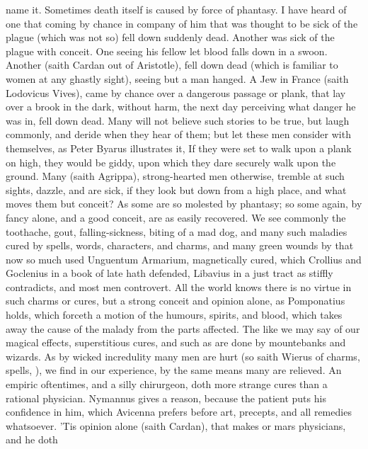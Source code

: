 {name it. Sometimes death itself is caused by force of phantasy. I have
heard of one that coming by chance in company of him that was thought
to be sick of the plague (which was not so) fell down suddenly dead.
Another was sick of the plague with conceit. One seeing his fellow let
blood falls down in a swoon. Another (saith Cardan out of
Aristotle), fell down dead (which is familiar to women at any ghastly
sight), seeing but a man hanged. A Jew in France (saith Lodovicus
Vives), came by chance over a dangerous passage or plank, that lay over
a brook in the dark, without harm, the next day perceiving what danger
he was in, fell down dead. Many will not believe such stories to be
true, but laugh commonly, and deride when they hear of them; but let
these men consider with themselves, as Peter Byarus illustrates
it, If they were set to walk upon a plank on high, they would be giddy,
upon which they dare securely walk upon the ground. Many (saith
Agrippa), strong-hearted men otherwise, tremble at such sights,
dazzle, and are sick, if they look but down from a high place, and what
moves them but conceit? As some are so molested by phantasy; so some
again, by fancy alone, and a good conceit, are as easily recovered. We
see commonly the toothache, gout, falling-sickness, biting of a mad
dog, and many such maladies cured by spells, words, characters, and
charms, and many green wounds by that now so much used Unguentum
Armarium, magnetically cured, which Crollius and Goclenius in a book of
late hath defended, Libavius in a just tract as stiffly contradicts,
and most men controvert. All the world knows there is no virtue in such
charms or cures, but a strong conceit and opinion alone, as
Pomponatius holds, which forceth a motion of the humours,
spirits, and blood, which takes away the cause of the malady from the
parts affected. The like we may say of our magical effects,
superstitious cures, and such as are done by mountebanks and wizards.
As by wicked incredulity many men are hurt (so saith Wierus of
charms, spells, \etc{}), we find in our experience, by the same means many
are relieved. An empiric oftentimes, and a silly chirurgeon, doth more
strange cures than a rational physician. Nymannus gives a reason,
because the patient puts his confidence in him,  which Avicenna
prefers before art, precepts, and all remedies whatsoever. 'Tis opinion
alone (saith Cardan), that makes or mars physicians, and he doth
}
